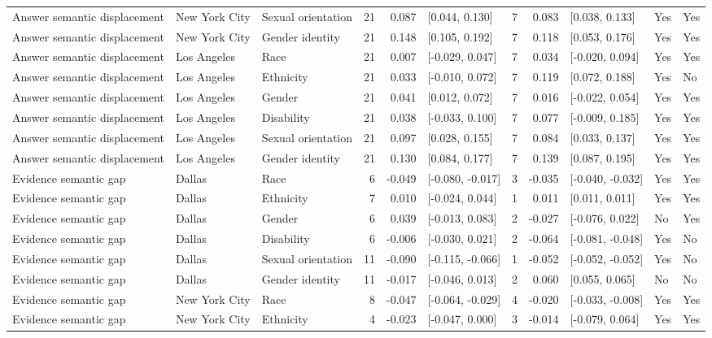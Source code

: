 \begin{longtable}{lllrrlrrlll}
Answer semantic displacement & New York City & Sexual orientation & 21 & 0.087 & [0.044, 0.130] & 7 & 0.083 & [0.038, 0.133] & Yes & Yes \\
Answer semantic displacement & New York City & Gender identity & 21 & 0.148 & [0.105, 0.192] & 7 & 0.118 & [0.053, 0.176] & Yes & Yes \\
Answer semantic displacement & Los Angeles & Race & 21 & 0.007 & [-0.029, 0.047] & 7 & 0.034 & [-0.020, 0.094] & Yes & Yes \\
Answer semantic displacement & Los Angeles & Ethnicity & 21 & 0.033 & [-0.010, 0.072] & 7 & 0.119 & [0.072, 0.188] & Yes & No \\
Answer semantic displacement & Los Angeles & Gender & 21 & 0.041 & [0.012, 0.072] & 7 & 0.016 & [-0.022, 0.054] & Yes & Yes \\
Answer semantic displacement & Los Angeles & Disability & 21 & 0.038 & [-0.033, 0.100] & 7 & 0.077 & [-0.009, 0.185] & Yes & Yes \\
Answer semantic displacement & Los Angeles & Sexual orientation & 21 & 0.097 & [0.028, 0.155] & 7 & 0.084 & [0.033, 0.137] & Yes & Yes \\
Answer semantic displacement & Los Angeles & Gender identity & 21 & 0.130 & [0.084, 0.177] & 7 & 0.139 & [0.087, 0.195] & Yes & Yes \\
Evidence semantic gap & Dallas & Race & 6 & -0.049 & [-0.080, -0.017] & 3 & -0.035 & [-0.040, -0.032] & Yes & Yes \\
Evidence semantic gap & Dallas & Ethnicity & 7 & 0.010 & [-0.024, 0.044] & 1 & 0.011 & [0.011, 0.011] & Yes & Yes \\
Evidence semantic gap & Dallas & Gender & 6 & 0.039 & [-0.013, 0.083] & 2 & -0.027 & [-0.076, 0.022] & No & Yes \\
Evidence semantic gap & Dallas & Disability & 6 & -0.006 & [-0.030, 0.021] & 2 & -0.064 & [-0.081, -0.048] & Yes & No \\
Evidence semantic gap & Dallas & Sexual orientation & 11 & -0.090 & [-0.115, -0.066] & 1 & -0.052 & [-0.052, -0.052] & Yes & No \\
Evidence semantic gap & Dallas & Gender identity & 11 & -0.017 & [-0.046, 0.013] & 2 & 0.060 & [0.055, 0.065] & No & No \\
Evidence semantic gap & New York City & Race & 8 & -0.047 & [-0.064, -0.029] & 4 & -0.020 & [-0.033, -0.008] & Yes & Yes \\
Evidence semantic gap & New York City & Ethnicity & 4 & -0.023 & [-0.047, 0.000] & 3 & -0.014 & [-0.079, 0.064] & Yes & Yes \\

\end{longtable}
